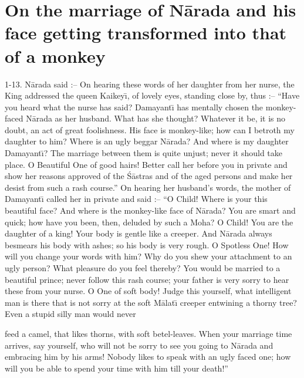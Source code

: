 \chapter{On the marriage of N\=arada and his face getting transformed into that of a monkey}

1-13. N\=arada said :-- On hearing these words of her daughter from her nurse, the King addressed the queen Kaikey\={\i}, of lovely eyes, standing close by, thus :-- ``Have you heard what the nurse has said? Damayant\={\i} has mentally chosen the monkey-faced N\=arada as her husband. What has she thought? Whatever it be, it is no doubt, an act of great foolishness. His face is monkey-like; how can I betroth my daughter to him? Where is an ugly beggar N\=arada? And where is my daughter Damayant\={\i}? The marriage between them is quite unjust; never it should take place. O Beautiful One of good hairs! Better call her before you in private and show her reasons approved of the \'S\=astras and of the aged persons and make her desist from such a rash course.'' On hearing her husband's words, the mother of Damayant\={\i} called her in private and said :-- ``O Child! Where is your this beautiful face? And where is the monkey-like face of N\=arada? You are smart and quick; how have you been, then, deluded by such a Moha? O Child! You are the daughter of a king! Your body is gentle like a creeper. And N\=arada always besmears his body with ashes; so his body is very rough. O Spotless One! How will you change your words with him? Why do you shew your attachment to an ugly person? What pleasure do you feel thereby? You would be married to a beautiful prince; never follow this rash course; your father is very sorry to hear these from your nurse. O One of soft body! Judge this yourself, what intelligent man is there that is not sorry at the soft M\=alat\={\i} creeper entwining a thorny tree? Even a stupid silly man would never

feed a camel, that likes thorns, with soft betel-leaves. When your marriage time arrives, say yourself, who will not be sorry to see you going to N\=arada and embracing him by his arms! Nobody likes to speak with an ugly faced one; how will you be able to spend your time with him till your death!''


